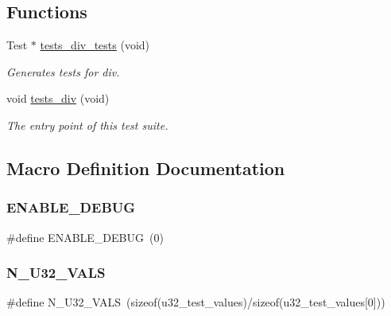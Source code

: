 \subsection*{Functions}
\begin{DoxyCompactItemize}
\item 
Test $\ast$ \hyperlink{group__unittests_ga8e77add06e39b1bb9dbf9004f2ea4c95}{tests\+\_\+div\+\_\+tests} (void)
\begin{DoxyCompactList}\small\item\em Generates tests for div. \end{DoxyCompactList}\item 
void \hyperlink{group__unittests_ga1161adbe65ee71e46440423762d1ed8b}{tests\+\_\+div} (void)
\begin{DoxyCompactList}\small\item\em The entry point of this test suite. \end{DoxyCompactList}\end{DoxyCompactItemize}


\subsection{Macro Definition Documentation}
\mbox{\label{tests-div_8c_a432138093c53d7580af9ec5c5dca387f}} 
\subsubsection{\texorpdfstring{E\+N\+A\+B\+L\+E\+\_\+\+D\+E\+B\+UG}{ENABLE\_DEBUG}}
{\footnotesize\ttfamily \#define E\+N\+A\+B\+L\+E\+\_\+\+D\+E\+B\+UG~(0)}

\mbox{\label{tests-div_8c_ace6ba5e282a9a6e4eead9dfefbfe61f3}} 
\subsubsection{\texorpdfstring{N\+\_\+\+U32\+\_\+\+V\+A\+LS}{N\_U32\_VALS}}
{\footnotesize\ttfamily \#define N\+\_\+\+U32\+\_\+\+V\+A\+LS~(sizeof(u32\+\_\+test\+\_\+values)/sizeof(u32\+\_\+test\+\_\+values\mbox{[}0\mbox{]}))}

